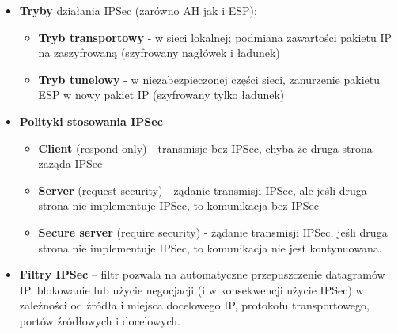 \documentclass[main.tex]{subfiles}
\begin{document}
\begin{itemize}[noitemsep]
        \item \textbf{Tryby} działania IPSec (zarówno AH jak i ESP):
        \begin{itemize}[noitemsep]
            \item \textbf{Tryb transportowy} - w sieci lokalnej; podmiana zawartości pakietu IP na zaszyfrowaną (szyfrowany
            nagłówek i ładunek)
            \item \textbf{Tryb tunelowy} - w niezabezpieczonej części sieci, zanurzenie pakietu ESP w nowy pakiet IP
            (szyfrowany tylko ładunek)
        \end{itemize}

        \item \textbf{Polityki stosowania IPSec}
        \begin{itemize}[noitemsep]
            \item \textbf{Client} (respond only) - transmisje bez IPSec, chyba że druga strona zażąda IPSec
            \item \textbf{Server} (request security) - żądanie transmisji IPSec, ale jeśli druga strona nie implementuje IPSec, to komunikacja bez IPSec
            \item \textbf{Secure server} (require security) - żądanie transmisji IPSec, jeśli druga strona nie implementuje IPSec, to komunikacja nie jest kontynuowana.
        \end{itemize}

        \item \textbf{Filtry IPSec} -- filtr pozwala na automatyczne przepuszczenie datagramów IP, blokowanie lub użycie
        negocjacji (i w konsekwencji użycie IPSec) w zależności od źródła i miejsca docelowego IP, protokołu
        transportowego, portów źródłowych i docelowych.
    \end{itemize}
\end{document}
